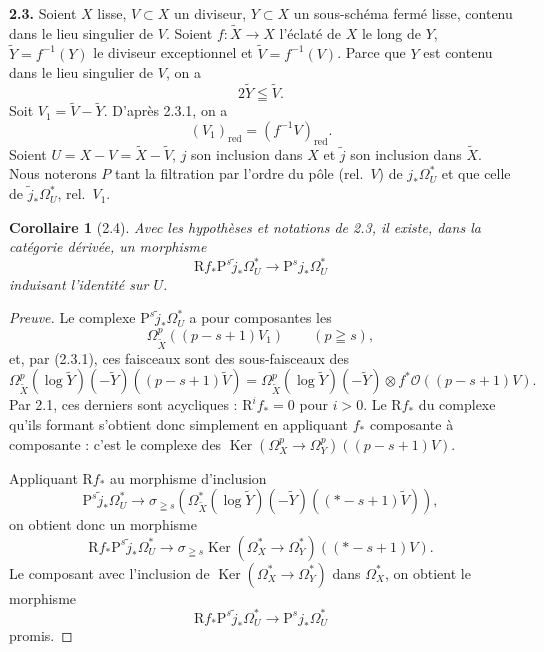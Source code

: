 \documentclass[12pt,a4paper]{article}
\theoremstyle{plain}
\newtheorem{corollary}[theorem]{Corollaire}
\theoremstyle{definition}
\DeclareMathOperator{\Ker}{Ker}
\begin{document}
\medskip

\textbf{2.3.} Soient $X$ lisse, $V \subset X$ un diviseur, $Y \subset X$ un sous-schéma fermé lisse, contenu dans le lieu singulier de $V$. Soient $f : \tilde{X} \to X$ l'éclaté de $X$ le long de $Y$, $\tilde{Y} = f^{-1}(Y)$ le diviseur exceptionnel et $\tilde{V} = f^{-1}(V)$. Parce que $Y$ est contenu dans le lieu singulier de $V$, on a
\begin{equation}\label{eq:2.3.1}
2\tilde{Y} \leqq \tilde{V}.
\tag{2.3.1}
\end{equation}
Soit $V_1 = \tilde{V} - \tilde{Y}$. D'après 2.3.1, on a
\[
(V_1)_{\mathrm{red}} = (f^{-1}V)_{\mathrm{red}}.
\]
Soient $U = X - V = \tilde{X} - \tilde{V}$, $j$ son inclusion dans $X$ et $\tilde{j}$ son inclusion dans $\tilde{X}$. Nous noterons $P$ tant la filtration par l'ordre du pôle (rel.\ $V$) de $j_* \Omega_U^*$ et que celle de $\tilde{j}_* \Omega_U^*$, rel.\ $V_1$.

\begin{corollary}[2.4]
Avec les hypothèses et notations de \emph{2.3}, il existe, dans la catégorie dérivée, un morphisme
\begin{equation}\label{eq:2.4.1}
\mathrm{R}f_* \mathrm{P}^s \tilde{j}_* \Omega_U^* \to \mathrm{P}^s j_* \Omega_U^*
\tag{2.4.1}
\end{equation}
induisant l'identité sur $U$.
\end{corollary}

\begin{proof}[Preuve]
Le complexe $\mathrm{P}^s \tilde{j}_* \Omega_U^*$ a pour composantes les
\[
\Omega_{\tilde{X}}^p((p-s+1)V_1) \qquad (p \geqq s),
\]
et, par (2.3.1), ces faisceaux sont des sous-faisceaux des
\[
\Omega_{\tilde{X}}^p(\log \tilde{Y})(-\tilde{Y})((p-s+1)\tilde{V}) = \Omega_{\tilde{X}}^p(\log \tilde{Y})(-\tilde{Y}) \otimes f^* \mathscr{O}((p-s+1)V).
\]
Par 2.1, ces derniers sont acycliques : $\mathrm{R}^i f_* = 0$ pour $i > 0$. Le $\mathrm{R}f_*$ du complexe qu'ils formant s'obtient donc simplement en appliquant $f_*$ composante à composante : c'est le complexe des $\Ker(\Omega_X^p \to \Omega_Y^p)((p-s+1)V)$.

Appliquant $\mathrm{R}f_*$ au morphisme d'inclusion
\[
\mathrm{P}^s \tilde{j}_* \Omega_U^* \to \sigma_{\geqq s}(\Omega_{\tilde{X}}^*(\log \tilde{Y})(-\tilde{Y})((*-s+1)\tilde{V})),
\]
on obtient donc un morphisme
\[
\mathrm{R}f_* \mathrm{P}^s \tilde{j}_* \Omega_U^* \to \sigma_{\geqq s} \Ker(\Omega_X^* \to \Omega_Y^*)((*-s+1)V).
\]
Le composant avec l'inclusion de $\Ker(\Omega_X^* \to \Omega_Y^*)$ dans $\Omega_X^*$, on obtient le morphisme
\[
\mathrm{R}f_* \mathrm{P}^s \tilde{j}_* \Omega_U^* \to \mathrm{P}^s j_* \Omega_U^*
\]
promis.
\end{proof}
\end{document}
